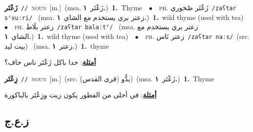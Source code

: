 \documentclass[10pt,a4paper,twoside]{article} %
\begin{document}
\begin{multicols}{2}
{\setlength\topsep{0pt}\textbf{\foreignlanguage{arabic}{زَعْتَر}}\ {\color{gray}\texttt{//}\color{black}}\ \textsc{noun}\ [m.]\ \color{gray}(msa. \foreignlanguage{arabic}{زَعْتَر}~\foreignlanguage{arabic}{\textbf{١.}})\color{black}\ \textbf{1.}~Thyme\ \ $\bullet$\ \ \textsc{ph.} \color{gray} \foreignlanguage{arabic}{زَعْتَر صْخوري}\color{black}\ {\color{gray}\texttt{/{\sffamily zaʕtar sˤxuːri}/}\color{black}}\ \color{gray} (msa. \foreignlanguage{arabic}{زعتر بري يستخدم مع الشاي}~\foreignlanguage{arabic}{\textbf{١.}})\color{black}\ \textbf{1.}~wild thyme (used with tea)\ \ $\bullet$\ \ \textsc{ph.} \color{gray} \foreignlanguage{arabic}{زعتر بلَاط}\color{black}\ {\color{gray}\texttt{/{\sffamily zaʕtar balaːtˤ}/}\color{black}}\ \color{gray} (msa. \foreignlanguage{arabic}{زعتر بري يستخدم مع الشاي}~\foreignlanguage{arabic}{\textbf{١.}})\color{black}\ \textbf{1.}~wild thyme (used with tea)\ \ $\bullet$\ \ \textsc{ph.} \color{gray} \foreignlanguage{arabic}{زعتر نَاس}\color{black}\ {\color{gray}\texttt{/{\sffamily zaʕtar naːs}/}\color{black}}\ \color{gray}(src. \foreignlanguage{arabic}{بيت ليد})\color{black}\ \color{gray} (msa. \foreignlanguage{arabic}{زعتر}~\foreignlanguage{arabic}{\textbf{١.}})\color{black}\ \textbf{1.}~thyme\  \begin{flushright}\color{gray}\foreignlanguage{arabic}{\textbf{\underline{\foreignlanguage{arabic}{أمثلة}}}: حدا باكل زَعْتَر ناس حاف؟}\end{flushright}\color{black}} \vspace{2mm}

{\setlength\topsep{0pt}\textbf{\foreignlanguage{arabic}{زِعْتَر}}\ {\color{gray}\texttt{//}\color{black}}\ \textsc{noun}\ [m.]\ (src. \color{gray}\foreignlanguage{arabic}{بدُّو (قرى القدس)}\color{black})\ \color{gray}(msa. \foreignlanguage{arabic}{زَعْتَر}~\foreignlanguage{arabic}{\textbf{١.}})\color{black}\ \textbf{1.}~Thyme\  \begin{flushright}\color{gray}\foreignlanguage{arabic}{\textbf{\underline{\foreignlanguage{arabic}{أمثلة}}}: في أحلى من الفطور يكون زيت وزِعْتَر بالباكورة}\end{flushright}\color{black}} \vspace{2mm}

\vspace{-3mm}
\subsection*{\color{blue}\foreignlanguage{arabic}{ز.ع.ج}\color{blue}{}} 


\end{multicols}
\end{document}
